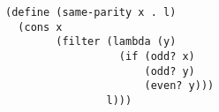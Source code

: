 \documentclass[a4paper,12pt]{article}
\begin{document}
\begin{lstlisting}
(define (same-parity x . l)
  (cons x
        (filter (lambda (y)
                  (if (odd? x)
                      (odd? y)
                      (even? y)))
                l)))
        
\end{lstlisting}
\end{document}
